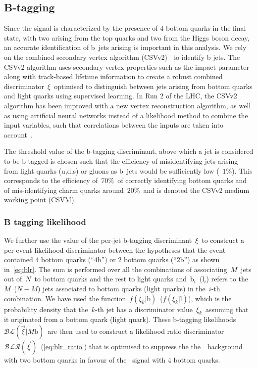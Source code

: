 \subsection{B-tagging}
\label{sec:object_id_btag}

Since the \ttHbb\xspace signal is characterized by the presence of 4 bottom quarks in the final state, with two arising from the top quarks and two from the Higgs boson decay, an accurate identification of b~jets arising is important in this analysis. We rely on the combined secondary vertex algorithm (CSVv2)~\cite{Chatrchyan:2012jua} to identify b jets. The CSVv2 algorithm uses secondary vertex properties such as the impact parameter along with track-based lifetime information to create a robust combined discriminator~$\xi$~optimised to distinguish between jets arising from bottom quarks and light quarks using supervised learning. In Run 2 of the LHC, the CSVv2 algorithm has been improved with a new vertex reconstruction algorithm, as well as using artificial neural networks instead of a likelihood method to combine the input variables, such that correlations between the inputs are taken into account~\cite{CMS-PAS-BTV-15-001}.

The threshold value of the b-tagging discriminant, above which a jet is considered to be b-tagged is chosen such that the efficiency of misidentifying jets arising from light quarks (u,d,s) or gluons as b~jets would be sufficiently low (~$1\%$). This corresponds to the efficiency of~$70\%$~of correctly identifying bottom quarks and of mis-identifying charm quarks around~$20\%$~and is denoted the CSVv2 medium working point (CSVM).

\subsubsection{B tagging likelihood}
We further use the value of the per-jet b-tagging discriminant~$\xi$~to construct a per-event likelihood discriminator between the hypotheses that the event contained 4 bottom quarks (``$4\mathrm{b}$'') or 2 bottom quarks (``$2\mathrm{b}$'') as shown in~\cref{eq:blr}. The sum is performed over all the combinations of associating~$M$~jets out of~$N$~to bottom quarks and the rest to light quarks and~$\mathrm{b}_i$~($\mathrm{l}_i$) refers to the~$M$~($N-M$) jets associated to bottom quarks (light quarks) in the~$i$-th combination. We have used the function~$f(\xi_k | \mathrm{b})$~($f(\xi_k | \mathrm{l})$), which is the probability density that the~$k$-th jet has a discriminator value~$\xi_k$~assuming that it originated from a bottom quark (light quark). These b-tagging likelihoods~$\mathcal{BL}(\vec{\xi} | M\mathrm{b})$~are then used to construct a likelihood ratio discriminator~$\mathcal{BLR}(\vec{\xi})$~(\cref{eq:blr_ratio}) that is optimised to suppress the the~\ttlf~background with two bottom quarks in favour of the~\ttHbb\xspace signal with 4 bottom quarks.

